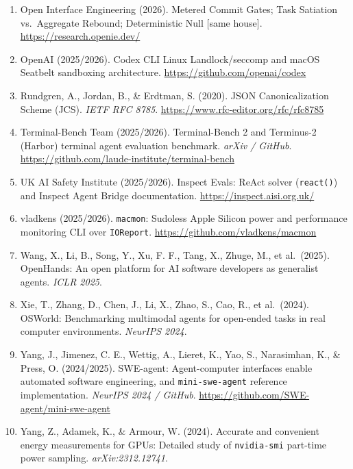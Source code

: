 \documentclass[10pt,letterpaper]{article}
\begin{document}
\begin{enumerate}
\item
  Open Interface Engineering (2026). Metered Commit Gates; Task
  Satiation vs.~Aggregate Rebound; Deterministic Null {[}same house{]}.
  \url{https://research.openie.dev/}
\item
  OpenAI (2025/2026). Codex CLI Linux Landlock/seccomp and macOS
  Seatbelt sandboxing architecture.
  \url{https://github.com/openai/codex}
\item
  Rundgren, A., Jordan, B., \& Erdtman, S. (2020). JSON Canonicalization
  Scheme (JCS). \emph{IETF RFC 8785}.
  \url{https://www.rfc-editor.org/rfc/rfc8785}
\item
  Terminal-Bench Team (2025/2026). Terminal-Bench 2 and Terminus-2
  (Harbor) terminal agent evaluation benchmark. \emph{arXiv / GitHub}.
  \url{https://github.com/laude-institute/terminal-bench}
\item
  UK AI Safety Institute (2025/2026). Inspect Evals: ReAct solver
  (\texttt{react()}) and Inspect Agent Bridge documentation.
  \url{https://inspect.aisi.org.uk/}
\item
  vladkens (2025/2026). \texttt{macmon}: Sudoless Apple Silicon power
  and performance monitoring CLI over \texttt{IOReport}.
  \url{https://github.com/vladkens/macmon}
\item
  Wang, X., Li, B., Song, Y., Xu, F. F., Tang, X., Zhuge, M., et
  al.~(2025). OpenHands: An open platform for AI software developers as
  generalist agents. \emph{ICLR 2025}.
\item
  Xie, T., Zhang, D., Chen, J., Li, X., Zhao, S., Cao, R., et
  al.~(2024). OSWorld: Benchmarking multimodal agents for open-ended
  tasks in real computer environments. \emph{NeurIPS 2024}.
\item
  Yang, J., Jimenez, C. E., Wettig, A., Lieret, K., Yao, S., Narasimhan,
  K., \& Press, O. (2024/2025). SWE-agent: Agent-computer interfaces
  enable automated software engineering, and \texttt{mini-\allowbreak{}swe-\allowbreak{}agent}
  reference implementation. \emph{NeurIPS 2024 / GitHub}.
  \url{https://github.com/SWE-agent/mini-swe-agent}
\item
  Yang, Z., Adamek, K., \& Armour, W. (2024). Accurate and convenient
  energy measurements for GPUs: Detailed study of \texttt{nvidia-\allowbreak{}smi}
  part-time power sampling. \emph{arXiv:2312.12741}.
\end{enumerate}
\end{document}
